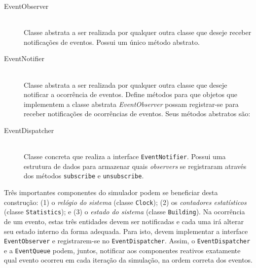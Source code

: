 \begin{description}
  \item[EventObserver] \hfill \\
    Classe abstrata a ser realizada por qualquer outra classe que deseje receber
    notificações de eventos. Possui um único método abstrato.


  \item[EventNotifier] \hfill \\
    Classe abstrata a ser realizada por qualquer outra classe que deseje
    notificar a ocorrência de eventos. Define métodos para que objetos que
    implementem a classe abstrata \textit{EventObserver} possam registrar-se
    para receber notificações de ocorrências de eventos. Seus métodos abstratos
    são:


  \item[EventDispatcher] \hfill \\
    Classe concreta que realiza a interface \texttt{EventNotifier}. Possui uma
    estrutura de dados para armazenar quais \textit{observers} se registraram
    através dos métodos \texttt{subscribe} e \texttt{unsubscribe}.
\end{description}

Três importantes componentes do simulador podem se beneficiar desta construção:
(1) o \textit{relógio do sistema} (classe \texttt{Clock}); (2) os
\textit{contadores estatísticos} (classe \texttt{Statistics}); e (3) o
\textit{estado do sistema} (classe \texttt{Building}). Na ocorrência de um
evento, estas três entidades devem ser notificadas e cada uma irá alterar seu
estado interno da forma adequada. Para isto, devem implementar a interface
\texttt{EventObserver} e registrarem-se no \texttt{EventDispatcher}. Assim, o
\texttt{EventDispatcher} e a \texttt{EventQueue} podem, juntos, notificar aos
componentes reativos exatamente qual evento ocorreu em cada iteração da
simulação, na ordem correta dos eventos.

